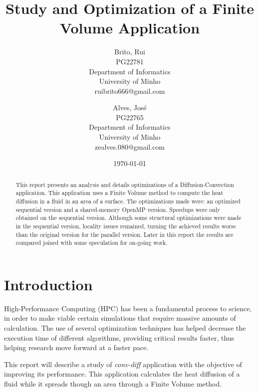 \documentclass[a4paper,10pt,openright,openbib,twocolumn]{article}
\begin{document}
\title{Study and Optimization of a Finite Volume Application}
\date{\today}
\begin{multicols}{2}
\author{
    Brito, Rui\\
    PG22781\\
    Department of Informatics\\
    University of Minho\\
    ruibrito666@gmail.com
  \and
    Alves, José\\
    PG22765\\
    Department of Informatics\\
    University of Minho\\
    zealves.080@gmail.com
}
\date{}
\maketitle
\end{multicols}

\begin{abstract}
    This report presents an analysis and details optimizations of a Diffusion-Convection application. This application uses a Finite Volume method to compute the heat diffusion in a fluid in an area of a surface. The optimizations made were: an optimized sequential version and a shared-memory OpenMP version.
    Speedups were only obtained on the sequential version. Although some structural optimizations were made in the sequential version, locality issues remained, turning the achieved results worse than the original version for the parallel version.
    Later in this report the results are compared joined with some speculation for on-going work.  
\end{abstract}

\section{Introduction}    %

High-Performance Computing (HPC) has been a fundamental process to science, in order to make viable certain simulations that require massive amounts of calculation. The use of several optimization techniques has helped decrease the execution time of different algorithms, providing critical results faster, thus helping research move forward at a faster pace.

This report will describe a study of \emph{conv-diff} application with the objective of improving its performance. This application calculates the heat diffusion of a fluid while it spreads though an area through a Finite Volume method. 
\end{document}
